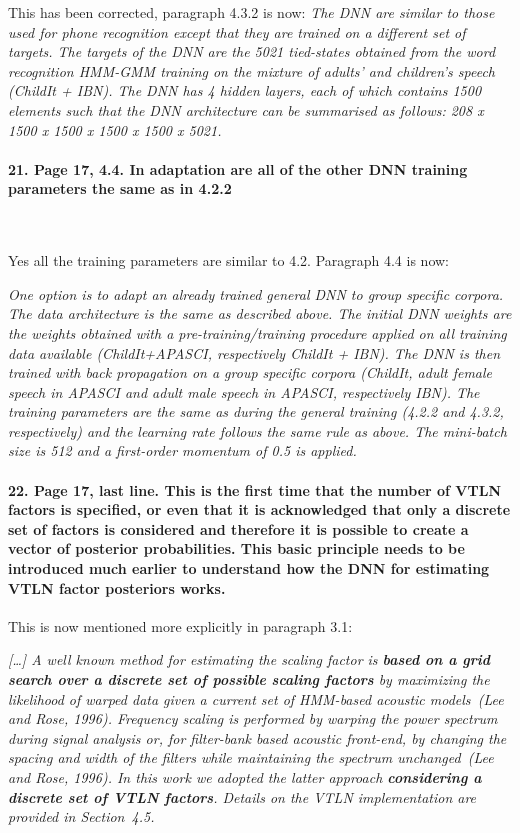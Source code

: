 \documentclass[]{article}
\begin{document}
This has been corrected, paragraph 4.3.2 is now:
\textit{The DNN  are similar to those  used for phone  recognition except that they are  trained on a different  set of targets. The  targets of the DNN are the 5021 tied-states obtained from the word recognition HMM-GMM training on the mixture of adults' and children's  speech (ChildIt + IBN). The DNN has 4 hidden  layers, each of which  contains 1500 elements  such that the DNN architecture  can be summarised  as follows: 208  x 1500 x  1500 x 1500 x 1500 x 5021.}

\paragraph{21. Page 17, 4.4. In adaptation are all of the other DNN training parameters the same as in 4.2.2}

~

Yes all the training parameters are similar to 4.2. Paragraph 4.4 is now:

\textit{One option is to adapt an already trained general DNN  to group specific corpora. The data architecture is the same as described above. The initial DNN weights are the weights obtained with a pre-training/training procedure applied on all training data available  (ChildIt+APASCI, respectively ChildIt + IBN). The DNN is then trained with back propagation on a group specific corpora (ChildIt, adult female speech in APASCI and adult male speech in APASCI, respectively IBN). The training parameters are the same as during the general training (4.2.2 and 4.3.2, respectively) and the learning rate follows the same rule as above. The mini-batch size is 512 and a first-order momentum of 0.5 is applied.}

\paragraph{22. Page 17, last line. This is the first time that the number of VTLN factors is specified, or even that it is acknowledged that only a discrete set of factors is considered and therefore it is possible to create a vector of posterior probabilities. This basic principle needs to be introduced much earlier to understand how the DNN for estimating VTLN factor posteriors works.}

This is now mentioned more explicitly in paragraph 3.1: 

\textit{[\dots] A  well  known  method  for estimating  the scaling  factor is \textbf{ based on  a  grid search  over a  discrete set  of possible scaling  factors} by maximizing the likelihood  of warped data given  a  current set  of  HMM-based acoustic  models~(Lee and Rose, 1996). Frequency scaling  is performed by  warping the power  spectrum during signal  analysis  or, for  filter-bank  based  acoustic front-end,  by changing the  spacing and width  of the filters while  maintaining the spectrum  unchanged~(Lee and Rose, 1996). In  this  work we  adopted  the latter approach \textbf{considering a discrete set of VTLN factors}. Details on the VTLN implementation  are provided in Section~4.5.}
\end{document}

